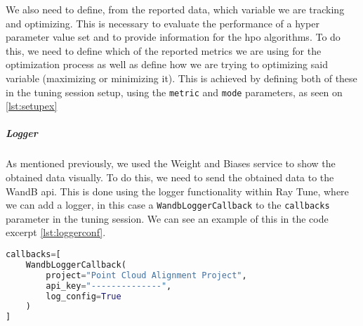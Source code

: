 We also need to define, from the reported data, which variable we are tracking and optimizing. This is necessary to evaluate the performance of a hyper parameter value set and to provide information for the \acrshort{hpo} algorithms. To do this, we need to define which of the reported metrics we are using for the optimization process as well as define how we are trying to optimizing said variable (maximizing or minimizing it). This is achieved by defining both of these in the tuning session setup, using the \verb!metric! and \verb!mode! parameters, as seen on \ref{lst:setupex}

\subparagraph{Logger}

As mentioned previously, we used the Weight and Biases service to show the obtained data visually. To do this, we need to send the obtained data to the WandB \acrshort{api}. This is done using the logger functionality within Ray Tune, where we can add a logger, in this case a \verb!WandbLoggerCallback! to the \verb!callbacks! parameter in the tuning session. We can see an example of this in the code excerpt \ref{lst:loggerconf}.

\begin{lstlisting}[language=Python, caption=Example WandB logger configuration, captionpos=b, label={lst:loggerconf}]
callbacks=[
    WandbLoggerCallback(
        project="Point Cloud Alignment Project",
        api_key="--------------",
        log_config=True
    )
]
\end{lstlisting}